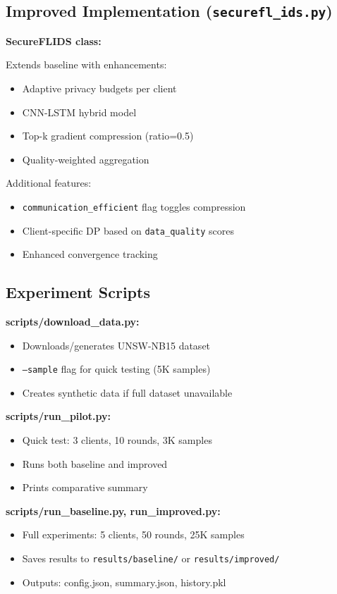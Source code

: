 \subsection{Improved Implementation (\texttt{securefl\_ids.py})}

\textbf{SecureFLIDS class:}

Extends baseline with enhancements:

\begin{itemize}
    \item Adaptive privacy budgets per client
    \item CNN-LSTM hybrid model
    \item Top-k gradient compression (ratio=0.5)
    \item Quality-weighted aggregation
\end{itemize}

Additional features:
\begin{itemize}
    \item \texttt{communication\_efficient} flag toggles compression
    \item Client-specific DP based on \texttt{data\_quality} scores
    \item Enhanced convergence tracking
\end{itemize}

\subsection{Experiment Scripts}

\textbf{scripts/download\_data.py:}
\begin{itemize}
    \item Downloads/generates UNSW-NB15 dataset
    \item \texttt{--sample} flag for quick testing (5K samples)
    \item Creates synthetic data if full dataset unavailable
\end{itemize}

\textbf{scripts/run\_pilot.py:}
\begin{itemize}
    \item Quick test: 3 clients, 10 rounds, 3K samples
    \item Runs both baseline and improved
    \item Prints comparative summary
\end{itemize}

\textbf{scripts/run\_baseline.py, run\_improved.py:}
\begin{itemize}
    \item Full experiments: 5 clients, 50 rounds, 25K samples
    \item Saves results to \texttt{results/baseline/} or \texttt{results/improved/}
    \item Outputs: config.json, summary.json, history.pkl
\end{itemize}

